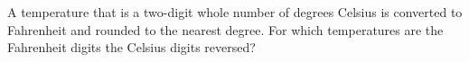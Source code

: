 A temperature that is a two-digit whole number of degrees Celsius is converted to Fahrenheit and rounded to the nearest degree. For which temperatures are the Fahrenheit digits the Celsius digits reversed?
